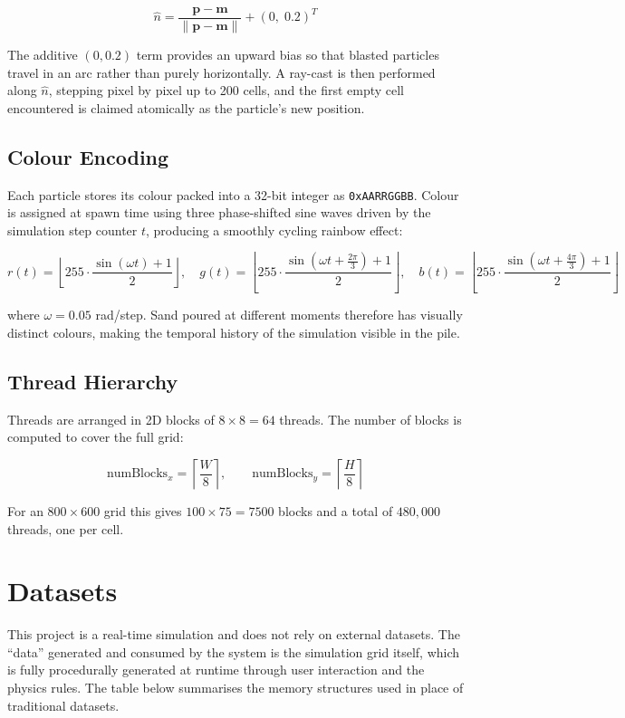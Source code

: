 \documentclass[12pt,a4paper]{article}
\begin{document}
    \[
        \hat{n} = \frac{\mathbf{p} - \mathbf{m}}{\|\mathbf{p} - \mathbf{m}\|} + (0,\; 0.2)^T
    \]

    The additive $(0, 0.2)$ term provides an upward bias so that blasted particles travel in 
    an arc rather than purely horizontally. A ray-cast is then performed along $\hat{n}$, 
    stepping pixel by pixel up to 200 cells, and the first empty cell encountered is claimed 
    atomically as the particle's new position.

	\subsection{Colour Encoding}
    Each particle stores its colour packed into a 32-bit integer as \texttt{0xAARRGGBB}. 
    Colour is assigned at spawn time using three phase-shifted sine waves driven by the 
    simulation step counter $t$, producing a smoothly cycling rainbow effect:

    \[
        r(t) = \left\lfloor 255 \cdot \frac{\sin(\omega t) + 1}{2} \right\rfloor, \quad
        g(t) = \left\lfloor 255 \cdot \frac{\sin(\omega t + \tfrac{2\pi}{3}) + 1}{2} \right\rfloor, \quad
        b(t) = \left\lfloor 255 \cdot \frac{\sin(\omega t + \tfrac{4\pi}{3}) + 1}{2} \right\rfloor
    \]

    where $\omega = 0.05$ rad/step. Sand poured at different moments therefore has visually 
    distinct colours, making the temporal history of the simulation visible in the pile.

	\subsection{Thread Hierarchy}
    Threads are arranged in 2D blocks of $8 \times 8 = 64$ threads. The number of blocks 
    is computed to cover the full grid:

    \[
        \text{numBlocks}_x = \left\lceil \frac{W}{8} \right\rceil, \qquad
        \text{numBlocks}_y = \left\lceil \frac{H}{8} \right\rceil
    \]

    For an $800 \times 600$ grid this gives $100 \times 75 = 7500$ blocks and a total of 
    $480,000$ threads, one per cell.


	\newpage
	\section{Datasets}
    This project is a real-time simulation and does not rely on external datasets. The 
    \textquotedblleft data\textquotedblright{} generated and consumed by the system is 
    the simulation grid itself, which is fully procedurally generated at runtime through 
    user interaction and the physics rules. The table below summarises the memory structures 
    used in place of traditional datasets.
\end{document}

